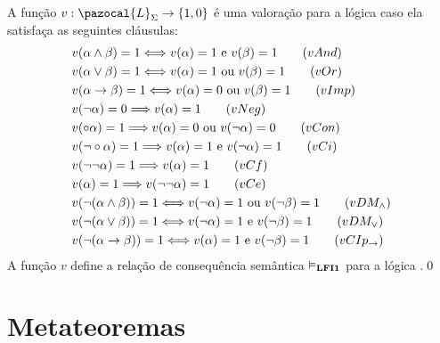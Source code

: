         \begin{definicao} 
            \label{def:valoracoes}
            A função $v : \pazocal{L}_{\Sigma} \rightarrow \{1, 0\}$ é uma valoração para a lógica \lfium{} caso ela satisfaça as seguintes cláusulas:
            \begin{align*}
                & v(\alpha \land \beta) = 1 \Longleftrightarrow v(\alpha) = 1 \text{ e } v(\beta) = 1\tag{\textbf{$vAnd$}}\\
                & v(\alpha \lor \beta) = 1 \Longleftrightarrow v(\alpha) = 1 \text{ ou } v(\beta) = 1\tag{\textbf{$vOr$}}\\
                & v(\alpha \rightarrow \beta) = 1 \Longleftrightarrow v(\alpha) = 0 \text{ ou } v(\beta) = 1\tag{\textbf{$vImp$}}\\
                & v(\neg \alpha) = 0 \Longrightarrow v(\alpha) = 1\tag{\textbf{$vNeg$}}\\
                & v(\circ \alpha) = 1 \Longrightarrow v(\alpha) = 0 \text{ ou } v(\neg \alpha) = 0\tag{\textbf{$vCon$}}\\
                & v(\neg \circ \alpha) = 1 \Longrightarrow v(\alpha) = 1 \text{ e } v(\neg \alpha) = 1\tag{\textbf{$vCi$}}\\
                & v(\neg \neg \alpha) = 1 \Longrightarrow v(\alpha) = 1\tag{\textbf{$vCf$}}\\
                & v(\alpha) = 1 \Longrightarrow v(\neg \neg \alpha) = 1\tag{\textbf{$vCe$}}\\
                & v(\neg (\alpha \land \beta)) = 1 \Longleftrightarrow v(\neg \alpha) = 1 \text{ ou } v(\neg \beta) = 1\tag{\textbf{$vDM_{\land}$}}\\
                & v(\neg (\alpha \lor \beta)) = 1 \Longleftrightarrow v(\neg \alpha) = 1 \text{ e } v(\neg \beta) = 1\tag{\textbf{$vDM_{\lor}$}}\\
                & v(\neg (\alpha \rightarrow \beta)) = 1 \Longleftrightarrow v(\alpha) = 1 \text{ e } v(\neg \beta) = 1\tag{\textbf{$vCIp_{\rightarrow}$}}
            \end{align*}
            A função $v$ define a relação de consequência semântica $\vDash_{\textbf{LFI1}{}}$ para a lógica \lfium{}.\qed{}
        \end{definicao}

\section{Metateoremas}
\label{sec:metateoremas}